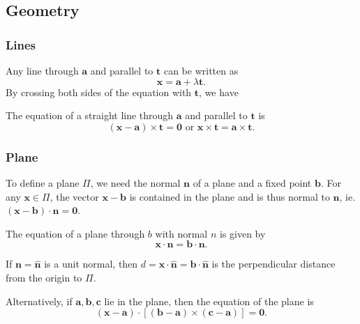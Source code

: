 \documentclass[a4paper]{article}
\begin{document}
\subsection{Geometry}
\subsubsection{Lines}
Any line through $\mathbf{a}$ and parallel to $\mathbf{t}$ can be written as
\[
  \mathbf{x} = \mathbf{a} + \lambda\mathbf{t}.
\]
By crossing both sides of the equation with $\mathbf{t}$, we have
\begin{thm} The equation of a straight line through $\mathbf{a}$ and parallel to $\mathbf{t}$ is
  \[
    \mathbf{(x - a)\times t = 0}\text{ or }\mathbf{x\times t = a\times t}.
  \]
\end{thm}
\subsubsection{Plane}
To define a plane $\Pi$, we need the normal $\mathbf{n}$ of a plane and a fixed point $\mathbf{b}$. For any $\mathbf{x}\in \Pi$, the vector $\mathbf{x - b}$ is contained in the plane and is thus normal to $\mathbf{n}$, ie. $\mathbf{(x - b)\cdot n = 0}$.
\begin{thm}
  The equation of a plane through $b$ with normal $n$ is given by
  \[
    \mathbf{x\cdot n = b\cdot n}.
  \]
\end{thm}
If $\mathbf{n = \hat n}$ is a unit normal, then $d = \mathbf{x\cdot\hat{n} = b\cdot\hat{n}}$ is the perpendicular distance from the origin to $\Pi$.

Alternatively, if $\mathbf{a, b, c}$ lie in the plane, then the equation of the plane is
\[
  \mathbf{(x - a)\cdot [(b - a)\times (c - a)] = 0}.
\]
\end{document}
